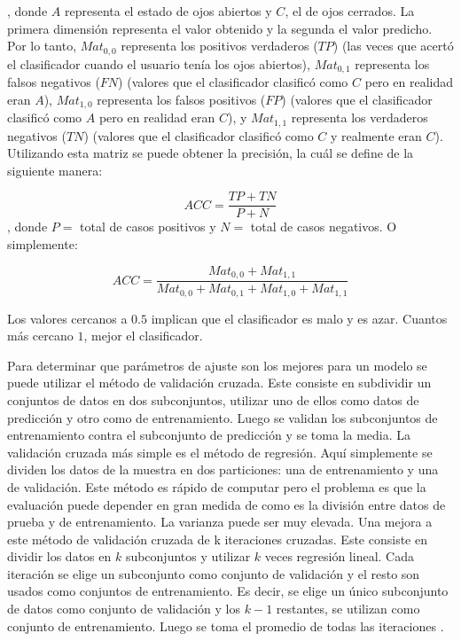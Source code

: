  , donde $ A $ representa el estado de ojos abiertos y $ C $, el de ojos cerrados. La primera dimensión representa el valor obtenido y la segunda el valor predicho. Por lo tanto, $Mat_{0,0}$ representa los positivos verdaderos ($TP$) (las veces que acertó el clasificador cuando el usuario tenía los ojos abiertos), $Mat_{0,1}$ representa los falsos negativos ($FN$) (valores que el clasificador clasificó como $C$ pero en realidad eran $A$), $Mat_{1,0}$ representa los falsos positivos ($FP$) (valores que el clasificador clasificó como $A$ pero en realidad eran $C$), y $Mat_{1,1}$ representa los verdaderos negativos ($TN$) (valores que el clasificador clasificó como $C$ y realmente eran $C$). Utilizando esta matriz se puede obtener la precisión, la cuál se define de la siguiente manera:
 
$$ ACC = \frac{TP + TN}{P + N} $$ 
, donde $P =$ total de casos positivos y $ N =$ total de casos negativos. O simplemente:

$$ ACC = \frac{Mat_{0,0} + Mat_{1,1}}{Mat_{0,0} + Mat_{0,1} + Mat_{1,0} + Mat_{1,1}} $$ 

Los valores cercanos a $0.5$ implican que el clasificador es malo y es azar. Cuantos más cercano $1$, mejor el clasificador.

Para determinar que parámetros de ajuste son los mejores para un modelo se puede utilizar el método de validación cruzada. Este consiste en subdividir un conjuntos de datos en dos subconjuntos, utilizar uno de ellos como datos de predicción y otro como de entrenamiento. Luego se validan los subconjuntos de entrenamiento contra el subconjunto de predicción y se toma la media. La validación cruzada más simple es el método de regresión. Aquí simplemente se dividen los datos de la muestra en dos particiones: una de entrenamiento y una de validación. Este método es rápido de computar pero el problema es que la evaluación puede depender en gran medida de como es la división entre datos de prueba y de entrenamiento. La varianza puede ser muy elevada. Una mejora a este método de validación cruzada de k iteraciones cruzadas. Este consiste en dividir los datos en $k$ subconjuntos y utilizar   $k$ veces regresión lineal. Cada iteración se elige un subconjunto como conjunto de validación y el resto son usados como conjuntos de entrenamiento. Es decir, se elige un único subconjunto de datos como conjunto de validación y los $k -1$ restantes, se utilizan como conjunto de entrenamiento. Luego se toma el promedio de todas las iteraciones \cite{cross-validation}.

